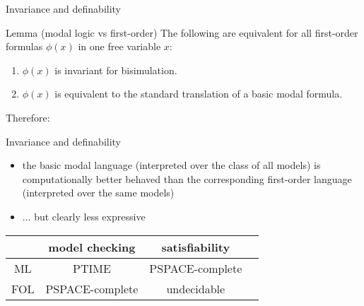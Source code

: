 \documentclass{beamer}
\begin{document}
\begin{slide}{Invariance and definability}\label{s:35}
\small

\begin{block}{Lemma (modal logic vs first-order)}
The following are equivalent for all first-order formulas $\phi(x)$ in one free variable $x$:
\begin{enumerate}
\item $\phi(x)$ is invariant for bisimulation.
\item $\phi(x)$ is equivalent to the standard translation of a basic modal formula.
 \end{enumerate}
  \end{block}
  
 Therefore:\\
\end{slide}


\begin{slide}{Invariance and definability}\label{s:36}
\small

\begin{itemize}
\item the basic modal language (interpreted over the class of all models) is computationally better behaved than the corresponding first-order language (interpreted over the same models)
\item ... but clearly less  expressive 
\end{itemize}

\begin{center}
\begin{tabular}{|c|c|c|c|}
\hline
 & model checking & satisfiability \\ \hline
 ML & PTIME & PSPACE-complete  \\
 FOL & PSPACE-complete & undecidable \\
 \hline
\end{tabular}
\end{center}

  
  \vspace{0.2cm}
\end{slide}
\end{document}
